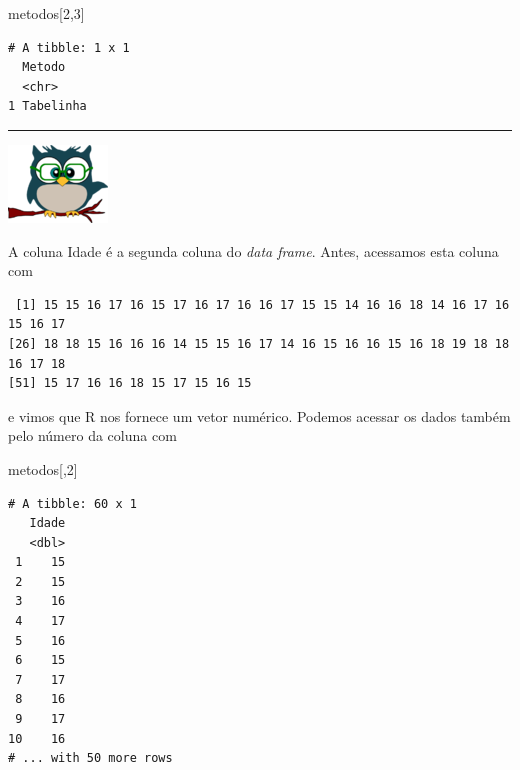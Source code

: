 \documentclass[
]{article}
\newenvironment{Shaded}{\begin{snugshade}}{\end{snugshade}}
\newcommand{\DecValTok}[1]{\textcolor[rgb]{0.00,0.00,0.81}{#1}}
\newcommand{\NormalTok}[1]{#1}
\newcommand{\SpecialCharTok}[1]{\textcolor[rgb]{0.00,0.00,0.00}{#1}}
\begin{document}
\begin{Shaded}
\begin{Highlighting}[]
\NormalTok{metodos[}\DecValTok{2}\NormalTok{,}\DecValTok{3}\NormalTok{]}
\end{Highlighting}
\end{Shaded}

\begin{verbatim}
# A tibble: 1 x 1
  Metodo   
  <chr>    
1 Tabelinha
\end{verbatim}

\begin{center}\rule{0.5\linewidth}{0.5pt}\end{center}

\begin{flushleft}\includegraphics[width=0.08\linewidth]{coruja} \end{flushleft}

A coluna Idade é a segunda coluna do \emph{data frame}. Antes, acessamos
esta coluna com

\begin{Shaded}
\end{Shaded}

\begin{verbatim}
 [1] 15 15 16 17 16 15 17 16 17 16 16 17 15 15 14 16 16 18 14 16 17 16 15 16 17
[26] 18 18 15 16 16 16 14 15 15 16 17 14 16 15 16 16 15 16 18 19 18 18 16 17 18
[51] 15 17 16 16 18 15 17 15 16 15
\end{verbatim}

e vimos que R nos fornece um vetor numérico. Podemos acessar os dados
também pelo número da coluna com

\begin{Shaded}
\begin{Highlighting}[]
\NormalTok{metodos[,}\DecValTok{2}\NormalTok{]}
\end{Highlighting}
\end{Shaded}

\begin{verbatim}
# A tibble: 60 x 1
   Idade
   <dbl>
 1    15
 2    15
 3    16
 4    17
 5    16
 6    15
 7    17
 8    16
 9    17
10    16
# ... with 50 more rows
\end{verbatim}
\end{document}
